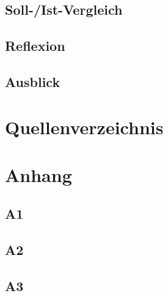 \documentclass[12pt]{article} %
\begin{document}
		\subsection{Soll-/Ist-Vergleich}
		\label{subsec:sollistvergleich}
		\sollistvergleichText
		
		\subsection{Reflexion}
		\label{subsec:reflexion}
		
		\subsection{Ausblick}
		\label{subsec:ausblick}
		\ausblickText
	
	\section{Quellenverzeichnis}
	\label{sec
	}
	\quellenverzeichnisText
\pagebreak
	
	\section{Anhang}
	\label{sec
	}
	\anhangText
	\subsection{A1}
	\label{subsec:a1}
	\anhangEins
	
	\subsection{A2}
	\label{subsec:a2}
	\anhangZwei
	
	\subsection{A3}
	\label{subsec:a3}
	\anhangDrei
	\pagebreak
	
\end{document}
